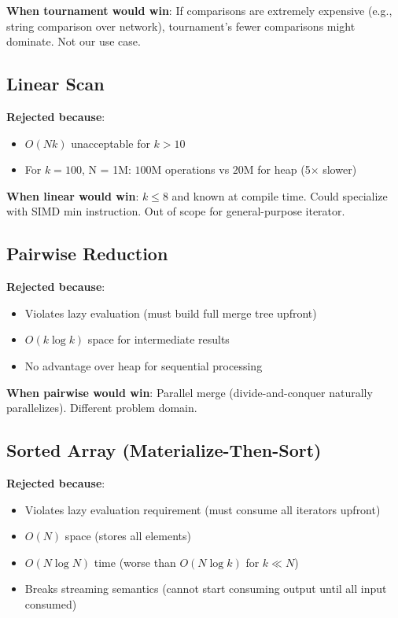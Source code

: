 \documentclass[11pt]{article}
\begin{document}
\textbf{When tournament would win}: If comparisons are extremely expensive (e.g., string comparison over network), tournament's fewer comparisons might dominate. Not our use case.

\subsection{Linear Scan}

\textbf{Rejected because}:
\begin{itemize}
    \item $O(Nk)$ unacceptable for $k > 10$
    \item For $k = 100$, N = 1M: $100$M operations vs $20$M for heap (5$\times$ slower)
\end{itemize}

\textbf{When linear would win}: $k \leq 8$ and known at compile time. Could specialize with SIMD min instruction. Out of scope for general-purpose iterator.

\subsection{Pairwise Reduction}

\textbf{Rejected because}:
\begin{itemize}
    \item Violates lazy evaluation (must build full merge tree upfront)
    \item $O(k \log k)$ space for intermediate results
    \item No advantage over heap for sequential processing
\end{itemize}

\textbf{When pairwise would win}: Parallel merge (divide-and-conquer naturally parallelizes). Different problem domain.

\subsection{Sorted Array (Materialize-Then-Sort)}

\textbf{Rejected because}:
\begin{itemize}
    \item Violates lazy evaluation requirement (must consume all iterators upfront)
    \item $O(N)$ space (stores all elements)
    \item $O(N \log N)$ time (worse than $O(N \log k)$ for $k \ll N$)
    \item Breaks streaming semantics (cannot start consuming output until all input consumed)
\end{itemize}
\end{document}
